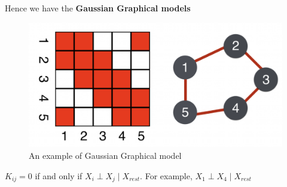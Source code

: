 Hence we have the \textbf{Gaussian Graphical models}
\begin{figure}[H]
  \centering
  \includegraphics[width = .7\linewidth]{codes/figures/section2/figure_2_7.png}
  \caption{An example of Gaussian Graphical model}
  \label{fig:ggm}
\end{figure}
$K_{ij}=0$ if and only if $X_i\perp X_j\mid X_{rest}$. For example, $X_1\perp X_4\mid X_{rest}$